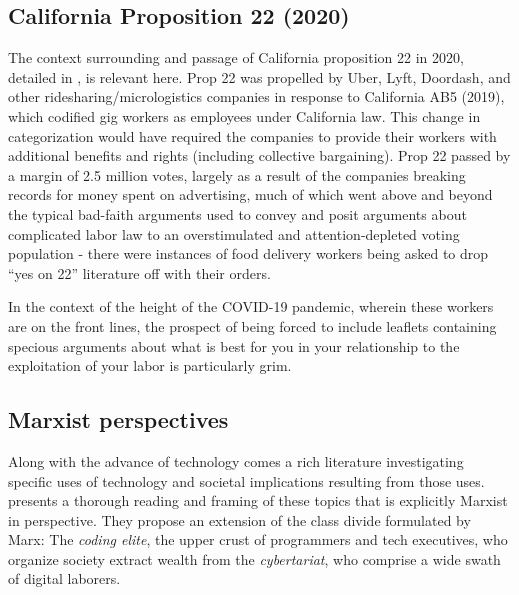 \subsection{California Proposition 22 (2020)}
The context surrounding and passage of California proposition 22 in
2020, detailed in \cite{cherry2021DispatchUnited}, is relevant
here. Prop 22 was propelled by Uber, Lyft, Doordash, and other
ridesharing/micrologistics companies in response to California AB5
(2019), which codified gig workers as employees under California
law. This change in categorization would have required the companies
to provide their workers with additional benefits and rights
(including collective bargaining). Prop 22 passed by a margin of 2.5
million votes, largely as a result of the companies breaking records
for money spent on advertising, much of which went above and beyond
the typical bad-faith arguments used to convey and posit arguments
about complicated labor law to an overstimulated and
attention-depleted voting population - there were instances of food
delivery workers being asked to drop ``yes on 22'' literature off with
their orders.

In the context of the height of the COVID-19 pandemic, wherein these
workers are on the front lines, the prospect of being forced to
include leaflets containing specious arguments about what is best for
you in your relationship to the exploitation of your labor is
particularly grim.

\subsection{Marxist perspectives}
Along with the advance of technology comes a rich literature
investigating specific uses of technology and societal implications
resulting from those uses. \cite{burrell2021SocietyAlgorithms}
presents a thorough reading and framing of these topics that is
explicitly Marxist in perspective. They propose an extension of the
class divide formulated by Marx: The \emph{coding elite}, the upper
crust of programmers and tech executives, who organize society extract
wealth from the \emph{cybertariat}, who comprise a wide swath of
digital laborers.

